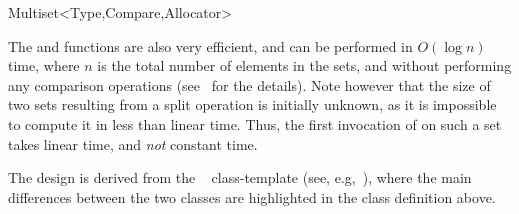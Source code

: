 \begin{ccRefClass}{Multiset<Type,Compare,Allocator>}
\begin{ccAdvanced}

The  and  functions are also very efficient, and
can be performed in $O(\log{n})$ time, where $n$ is the total number of
elements in the sets, and without performing any comparison operations
(see~\cite{t-dsna-83} for the details).
Note however that the size of two sets resulting from a split operation is
initially unknown, as it is impossible to compute it in less than linear time.
Thus, the first invocation of  on such a set takes linear time,
and {\em not} constant time.

\end{ccAdvanced}

The design is derived from the \stl\  class-template (see,
e.g,~\cite{cgal:ms-strg-96}), where the main differences between the two
classes are highlighted in the class definition above.

\end{ccRefClass}




